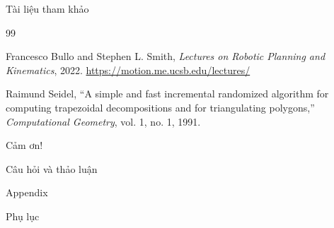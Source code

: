 \documentclass[aspectratio=169]{beamer}
\begin{document}
\begin{frame}[allowframebreaks]{Tài liệu tham khảo}
\begin{thebibliography}{99}

        Francesco Bullo and Stephen L. Smith, \emph{Lectures on Robotic Planning and Kinematics}, 2022. \url{https://motion.me.ucsb.edu/lectures/}


        Raimund Seidel, ``A simple and fast incremental randomized algorithm for computing trapezoidal decompositions and for triangulating polygons,'' \emph{Computational Geometry}, vol. 1, no. 1, 1991.
    \end{thebibliography}
\end{frame}

\begin{frame}[plain]
    \begin{center}
        {\Huge Cảm ơn!}

        \vspace{2em}

        {\large Câu hỏi và thảo luận}
    \end{center}
\end{frame}

\appendix
{}

\begin{frame}{Appendix}
    \begin{center}
        \Huge Phụ lục
    \end{center}
\end{frame}
\end{document}
